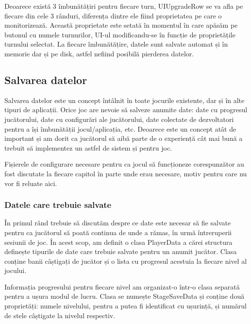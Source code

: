 \documentclass[12pt, a4paper]{article}
\begin{document}
	Deoarece există 3 îmbunătățiri pentru fiecare turn, UIUpgradeRow se va afla pe fiecare din cele 3 rânduri, diferența dintre ele fiind proprietatea pe care o monitorizează. Această proprietate este setată în momentul în care apăsăm pe butonul cu numele turnurilor, UI-ul modificandu-se în funcție de proprietățile turnului selectat. La fiecare îmbunătățire, datele sunt salvate automat și în memorie dar și pe disk, astfel nefiind posibilă pierderea datelor.
	
	
	
	
	
	\subsection{Salvarea datelor}
	
	Salvarea datelor este un concept întâlnit în toate jocurile existente, dar și în alte tipuri de aplicații. Orice joc are nevoie să salveze anumite date: date cu progresul jucătorului, date cu configurări ale jucătorului, date colectate de dezvoltatori pentru a își îmbunătății jocul/aplicația, etc. Deoarece este un concept atât de important și am dorit ca jucătorul să aibă parte de o experiență cât mai bună a trebuit să implementez un astfel de sistem și pentru joc.
	\newline
	
	Fișierele de configurare necesare pentru ca jocul să funcționeze corespunzător au fost discutate la fiecare capitol în parte unde erau necesare, motiv pentru care nu vor fi reluate aici.
	
	
	
	
	
	\subsubsection{Datele care trebuie salvate}
	
	În primul rând trebuie să discutăm despre ce date este necesar să fie salvate pentru ca jucătorul să poată continua de unde a rămas, în urmă întreruperii sesiunii de joc. În acest scop, am definit o clasa PlayerData a cărei structura definește tipurile de date care trebuie salvate pentru un anumit jucător. Clasa conține banii câștigați de jucător și o lista cu progresul acestuia la fiecare nivel al jocului. 
	\newline
	
	Informația progresului pentru fiecare nivel am organizat-o într-o clasa separată pentru a ușura modul de lucru. Clasa se numește StageSaveData și conține două proprietăți: numele nivelului, pentru a putea fi identificat cu ușurință, și numărul de stele câștigate la nivelul respectiv.
	\newline
	
\end{document}
